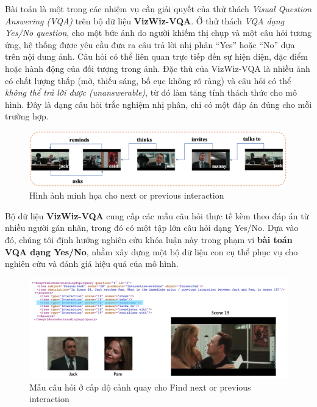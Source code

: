 Bài toán là một trong các nhiệm vụ cần giải quyết của thử thách \textit{Visual Question Answering (VQA)} trên bộ dữ liệu \textbf{VizWiz-VQA}. 
Ở thử thách \textit{VQA dạng Yes/No question}, cho một bức ảnh do người khiếm thị chụp và một câu hỏi tương ứng, hệ thống được yêu cầu đưa ra câu trả lời nhị phân ``Yes'' hoặc ``No'' dựa trên nội dung ảnh. 
Câu hỏi có thể liên quan trực tiếp đến sự hiện diện, đặc điểm hoặc hành động của đối tượng trong ảnh. 
Đặc thù của VizWiz-VQA là nhiều ảnh có chất lượng thấp (mờ, thiếu sáng, bố cục không rõ ràng) và câu hỏi có thể \textit{không thể trả lời được (unanswerable)}, từ đó làm tăng tính thách thức cho mô hình. 
Đây là dạng câu hỏi trắc nghiệm nhị phân, chỉ có một đáp án đúng cho mỗi trường hợp.  

\begin{figure}[!hbt]
    \centering
    \includegraphics[width=1.0\linewidth]{graphics/chapter1/next_previous_in.png}
    \caption{Hình ảnh minh họa cho next or previous interaction}
\end{figure}

Bộ dữ liệu \textbf{VizWiz-VQA} cung cấp các mẫu câu hỏi thực tế kèm theo đáp án từ nhiều người gán nhãn, trong đó có một tập lớn câu hỏi dạng Yes/No. 
Dựa vào đó, chúng tôi định hướng nghiên cứu khóa luận này trong phạm vi \textbf{bài toán VQA dạng Yes/No}, nhằm xây dựng một bộ dữ liệu con cụ thể phục vụ cho nghiên cứu và đánh giá hiệu quả của mô hình.  

\begin{figure}[!hbt]
    \centering
    \includegraphics[width=1.0\linewidth]{graphics/chapter1/next_previous_in1.png}
    \caption{Mẫu câu hỏi ở cấp độ cảnh quay cho Find next or previous interaction}
    \label{fig:next_previous}
\end{figure}

